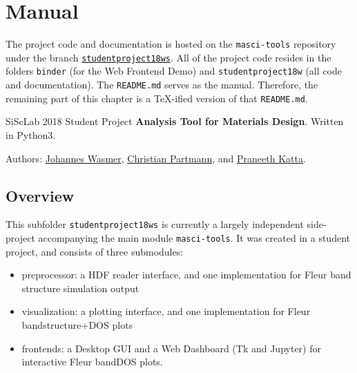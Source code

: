 
\chapter{Manual}
\label{cha:manual}

The project code and documentation is hosted on the \texttt{masci-tools}
repository \cite{masci-tools} under the branch
\href{https://github.com/JuDFTteam/masci-tools/tree/studentproject18ws}{\texttt{studentproject18ws}}.
All of the project code resides in the folders \texttt{binder} (for the Web
Frontend Demo) and \texttt{studentproject18w} (all code and documentation). The
\texttt{README.md} serves as the manual. Therefore, the remaining part of this
chapter is a \TeX{}-ified version of that \texttt{README.md}.

\vspace{3em}
\hdashrule{\textwidth}{2pt}{2pt}

SiScLab 2018 Student Project \textbf{Analysis Tool for Materials
Design}. Written in Python3.

Authors: \href{https://github.com/Irratzo}{Johannes Wasmer},
\href{https://github.com/ChristianPartmann}{Christian Partmann}, and
\href{https://github.com/PraneethKatta}{Praneeth Katta}.

\section{Overview}\label{overview}

This subfolder \texttt{studentproject18ws} is currently a largely
independent side-project accompanying the main module
\texttt{masci-tools}. It was created in a student project, and consists
of three submodules:

\begin{itemize}
\tightlist
\item
  preprocessor: a HDF reader interface, and one implementation for Fleur
  band structure simulation output
\item
  visualization: a plotting interface, and one implementation for Fleur
  bandstructure+DOS plots
\item
  frontends: a Desktop GUI and a Web Dashboard (Tk and Jupyter) for
  interactive Fleur bandDOS plots.
\end{itemize}

